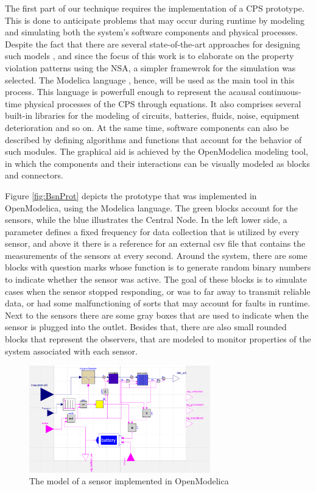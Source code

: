 The first part of our technique requires the implementation of a CPS prototype. This is done to anticipate problems that may occur during runtime by modeling and simulating both the system's software components and physical processes. Despite the fact that there are several state-of-the-art approaches for designing such models \cite{baras2019formal} \cite{deng2019modeling} \cite{bouskela2022formal}, and since the focus of this work is to elaborate on the property violation patterns using the NSA, a simpler framewrok for the simulation was selected. The Modelica language \cite{Modelica}, hence, will be used as the main tool in this process. This language is powerfull enough to represent the acausal continuous-time physical processes of the CPS through equations. It also comprises several built-in libraries for the modeling of circuits, batteries, fluids, noise, equipment deterioration and so on. At the same time, software components can also be described by defining algorithms and functions that account for the behavior of such modules. The graphical aid is achieved by the OpenModelica \cite{OpenModelica} modeling tool, in which the components and their interactions can be visually modeled as blocks and connectors.


Figure \ref{fig:BsnProt} depicts the prototype that was implemented in OpenModelica, using the Modelica language. The green blocks account for the sensors, while the blue illustrates the Central Node. In the left lower side, a parameter defines a fixed frequency for data collection that is utilized by every sensor, and above it there is a reference for an external csv file that contains the measurements of the sensors at every second. Around the system, there are some blocks with question marks whose function is to generate random binary numbers to indicate whether the sensor was active. The goal of these blocks is to simulate cases when the sensor stopped responding, or was to far away to transmit reliable data, or had some malfunctioning of sorts that may account for faults in runtime. Next to the sensors there are some gray boxes that are used to indicate when the sensor is plugged into the outlet. Besides that, there are also small rounded blocks that represent the observers, that are modeled to monitor properties of the system associated with each sensor.

\begin{figure}[!h]
	\centering
	\includegraphics[width=0.7\textwidth, keepaspectratio]{img/sensor_modelica.png}
	\caption{The model of a sensor implemented in OpenModelica}
	\label{fig:sensorProt}
\end{figure}

